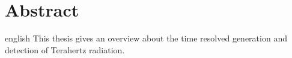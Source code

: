 \thispagestyle{plain}

\section*{Abstract}
\begin{foreignlanguage}{english}
This thesis gives an overview about the time resolved generation and detection of Terahertz radiation. 

\end{foreignlanguage}
